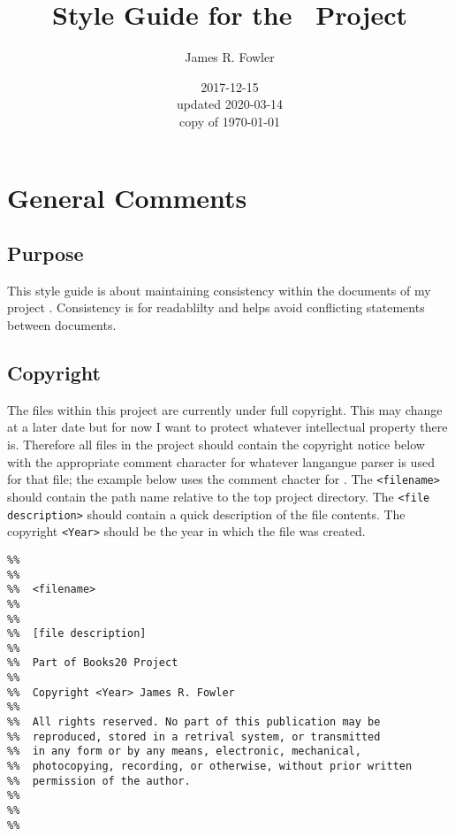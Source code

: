 \documentclass[twoside]{book}
\begin{document}
\frontmatter

\title{Style Guide for the \ProjectTitle\ Project}
\author{James R. Fowler}
\date{2017-12-15\\ updated 2020-03-14\\ copy of \today}

\maketitle

\tableofcontents

\mainmatter

\chapter{General Comments}

\section{Purpose}
This style guide is about maintaining consistency within the documents
of my project \ProjectTitle. Consistency is for readablilty and
helps avoid conflicting statements between documents. 

\section{Copyright}

The files within this project are currently under full copyright.  This
may change at a later date but for now I want to protect whatever
intellectual property there is.  Therefore all files in the project
should contain the copyright notice below with the appropriate comment
character for whatever langangue parser is used for that file; the
example below uses the comment chacter for \LaTeXe.  The
\texttt{<filename>} should contain the path name relative to the top
project directory. The \texttt{<file description>} should contain a
quick description of the file contents. The copyright \texttt{<Year>}
should be the year in which the file was created.

\begin{verbatim}
%%
%%
%%  <filename>
%%
%%  
%%  [file description]
%%
%%  Part of Books20 Project
%%
%%  Copyright <Year> James R. Fowler
%%
%%  All rights reserved. No part of this publication may be
%%  reproduced, stored in a retrival system, or transmitted
%%  in any form or by any means, electronic, mechanical,
%%  photocopying, recording, or otherwise, without prior written
%%  permission of the author.
%%
%%
%%
\end{verbatim}
\end{document}
